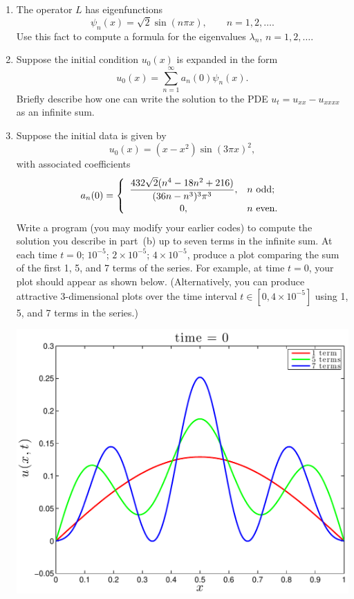 \begin{enumerate}
\item The operator $L$ has eigenfunctions 
       \[ \psi_n(x) = \sqrt{2} \sin(n \pi x), \qquad n=1, 2, \ldots.\]
      Use this fact to compute a formula for the eigenvalues $\lambda_n$,
       $n=1,2, \ldots.$
    
\item Suppose the initial condition $u_0(x)$ is expanded in the form
      \[ u_0(x) = \sum_{n=1}^\infty a_n(0) \psi_n(x).\]
      Briefly describe how one can write the solution to the 
      PDE $u_t = u_{xx}-u_{xxxx}$ as an infinite sum.

\item Suppose the initial data is given by
\[ u_0(x) = (x-x^2) \sin(3\pi x)^2,\]
with associated coefficients
\[ a_n(0) = \left\{ \begin{array}{cl} 
      \displaystyle{{432\sqrt{2} (n^4-18n^2 + 216) \over (36n-n^3)^3 \pi^3}}, & \mbox{$n$ odd}; \\[.75em]
      0, & \mbox{$n$ even}.
\end{array}\right. \]
Write a program (you may modify your earlier codes) to compute the
solution you describe in part~(b) up to seven terms in the infinite sum.
At each time $t=0$; $10^{-5}$; $2\times 10^{-5}$; $4 \times 10^{-5}$, produce a plot comparing 
the sum of the first 1, 5, and 7 terms of the series.
For example, at time $t=0$, your plot should appear as shown below.
(Alternatively, you can produce attractive 3-dimensional plots over the time interval
$t\in [0, 4\times10^{-5}]$ using 1, 5, and 7 terms in the series.)


\begin{center}
\includegraphics[scale=0.5]{fourth_a}
\end{center}
\end{enumerate}

